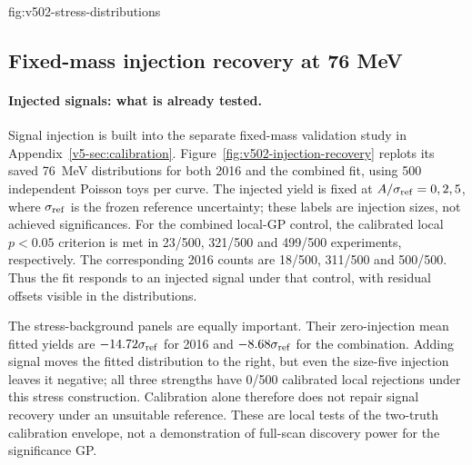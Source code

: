 {fig:v502-stress-distributions}

\subsection{Fixed-mass injection recovery at 76 MeV}
\paragraph{Injected signals: what is already tested.}
Signal injection is built into the separate fixed-mass validation study in
Appendix~\ref{v5-sec:calibration}. Figure~\ref{fig:v502-injection-recovery}
replots its saved 76~MeV distributions for both 2016 and the combined fit,
using 500 independent Poisson toys per curve. The injected yield is fixed at
$A/\sigma_{\rm ref}=0,2,5$, where $\sigma_{\rm ref}$ is the frozen reference
uncertainty; these labels are injection sizes, not achieved significances.
For the combined local-GP control, the calibrated local $p<0.05$ criterion
is met in 23/500, 321/500 and 499/500 experiments, respectively. The
corresponding 2016 counts are 18/500, 311/500 and 500/500. Thus the fit
responds to an injected signal under that control, with residual offsets
visible in the distributions.

The stress-background panels are equally important. Their zero-injection
mean fitted yields are $-14.72\sigma_{\rm ref}$ for 2016 and
$-8.68\sigma_{\rm ref}$ for the combination. Adding signal moves the
fitted distribution to the right, but even the size-five injection leaves
it negative; all three strengths have 0/500 calibrated local rejections
under this stress construction. Calibration alone therefore does not repair
signal recovery under an unsuitable reference. These are local tests of
the two-truth calibration envelope, not a demonstration of full-scan
discovery power for the significance GP.


